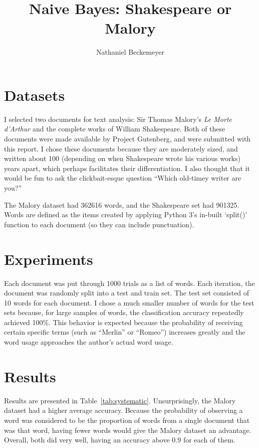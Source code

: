 \documentclass{journal}
\title{Naive Bayes: Shakespeare or Malory}
\author{Nathaniel Beckemeyer}
\begin{document}
\maketitle{}

\section{Datasets}
I selected two documents for text analysis: Sir Thomas Malory's \emph{Le
Morte d'Arthur} and the complete works of William Shakespeare. Both of these
documents were made available by Project Gutenberg, and were submitted with this
report. I chose these documents because they are moderately sized, and written
about 100 (depending on when Shakespeare wrote his various works)
years apart, which perhaps facilitates their differentiation. I also thought
that it would be fun to ask the clickbait-esque question
``Which old-timey writer are you?''

The Malory dataset had 362616 words, and the Shakespeare set had 901325. Words
are defined as the items created by applying Python 3's in-built `split()'
function to each document (so they can include punctuation).

\section{Experiments}
Each document was put through 1000 trials as a list of words. Each iteration,
the document was randomly split into a test and train set. The test set
consisted of 10 words for each document. I chose a much smaller number of words
for the test sets because, for large samples of words, the classification
accuracy repeatedly achieved 100\%. This behavior is expected because the
probability of receiving certain specific terms
(such as ``Merlin'' or ``Romeo'') increases greatly and the word usage
approaches the author's actual word usage.

\section{Results}
Results are presented in Table~\ref{tab:systematic}. Unsurprisingly, the Malory
dataset had a higher average accuracy. Because the probability of observing
a word was considered to be the proportion of words from a single document that
was that word, having fewer words would give the Malory dataset an advantage.
Overall, both did very well, having an accuracy above 0.9 for each of them.
\end{document}
